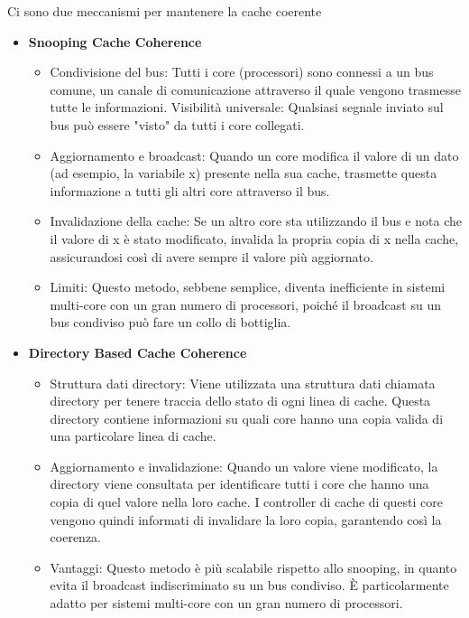 \documentclass[10pt, letterpaper]{report}
\begin{document}
Ci sono due meccanismi per mantenere la cache coerente\begin{itemize}
    \item \textbf{Snooping Cache Coherence}\begin{itemize}
        \item Condivisione del bus: Tutti i core (processori) sono connessi a un bus comune, un canale di comunicazione attraverso il quale vengono trasmesse tutte le informazioni.
        Visibilità universale: Qualsiasi segnale inviato sul bus può essere "visto" da tutti i core collegati.
        \item  Aggiornamento e broadcast: Quando un core modifica il valore di un dato (ad esempio, la variabile x) presente nella sua cache, trasmette questa informazione a tutti gli altri core attraverso il bus.
        \item  Invalidazione della cache: Se un altro core sta utilizzando  il bus e nota che il valore di x è stato modificato, invalida la propria copia di x nella cache, assicurandosi così di avere sempre il valore più aggiornato.
        \item  Limiti: Questo metodo, sebbene semplice, diventa inefficiente in sistemi multi-core con un gran numero di processori, poiché il broadcast su un bus condiviso può fare un collo di bottiglia.
    \end{itemize}
    \item \textbf{Directory Based Cache Coherence}\begin{itemize}
        \item Struttura dati directory: Viene utilizzata una struttura dati chiamata directory per tenere traccia dello stato di ogni linea di cache. Questa directory contiene informazioni su quali core hanno una copia valida di una particolare linea di cache.
        \item Aggiornamento e invalidazione: Quando un valore viene modificato, la directory viene consultata per identificare tutti i core che hanno una copia di quel valore nella loro cache. I controller di cache di questi core vengono quindi informati di invalidare la loro copia, garantendo così la coerenza.
        \item Vantaggi: Questo metodo è più scalabile rispetto allo snooping, in quanto evita il broadcast indiscriminato su un bus condiviso. È particolarmente adatto per sistemi multi-core con un gran numero di processori.
    \end{itemize}
\end{itemize}
\end{document}
